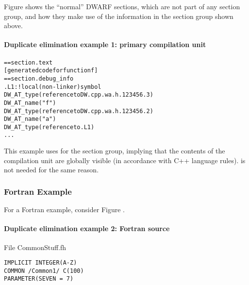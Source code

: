 Figure 
shows the ``normal'' DWARF sections, which are not part of
any section group, and how they make use of the information
in the section group shown above.

\paragraph{Duplicate elimination example 1: primary compilation unit} 
\label{app:duplicateeliminationexample1primarycompilationunit}
\begin{alltt}
== section .text
    [generated code for function f]
== section .debug\_info
.L1:                   ! local (non-linker) symbol
            DW\-\_AT\-\_type(reference to DW.cpp.wa.h.123456.3)
            DW\-\_AT\-\_name("f")
            DW\-\_AT\-\_type(reference to DW.cpp.wa.h.123456.2)
                DW\-\_AT\-\_name("a")
                DW\-\_AT\-\_type(reference to .L1)
        ...
\end{alltt}

This example uses  for the section group,
implying that the contents of the compilation unit are
globally visible (in accordance with C++ language rules).
 is not needed for the same reason.

\subsubsection{Fortran Example}


For a Fortran example, consider 
Figure .


\paragraph{Duplicate elimination example 2: Fortran source} 
\label{app:duplicateeliminationexample2fortransource}

File CommonStuff.fh

\begin{lstlisting}
IMPLICIT INTEGER(A-Z)
COMMON /Common1/ C(100)
PARAMETER(SEVEN = 7)
\end{lstlisting}

